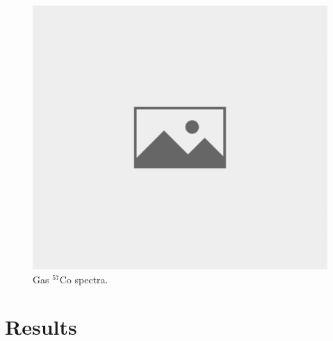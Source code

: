 \begin{figure}[H]
\centering
\includegraphics[scale=0.8, angle = 90]{./pictures/NoPicture.jpg}
\caption{Gas $^{57}$Co spectra.}
\label{Gas spectra.}

\end{figure}

\section{Results}




